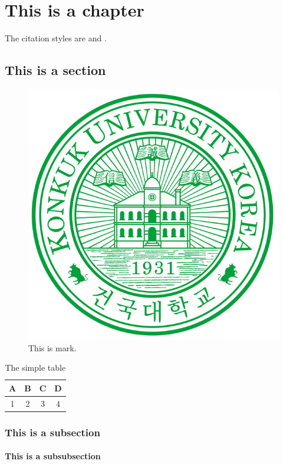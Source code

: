 \documentclass[11pt]{report}
\begin{document}
\begin{KUabstract}
\lipsum[1]
\end{KUabstract}



% 
%
\chapter{This is a chapter}
The citation styles are \cite{Weinberg:1967tq} and \cite{Glashow:1961tr,Salam:1964ry,Glashow:1970gm}.

\section{This is a section}

\begin{figure}[h] \centering
\begin{center}
\includegraphics[width=.1\textwidth]{UI_Mark.jpg}
\caption{This is mark.}
\end{center}
\end{figure}


\lipsum[1]

\begin{table}[h]
\begin{center}
\begin{tabular}{|c|c|c|c|}
  \hline
  A & B & C & D\\
  \hline
  1 & 2 & 3 & 4\\
  \hline
\end{tabular}
\end{center}
\caption{The simple table}
\end{table}

\subsection{This is a subsection}
\lipsum[1]
\subsubsection{This is a subsubsection}
\lipsum[1]


% 
%
\printbibliography[title={\normalfont\fontsize{16}{16}\bfseries References}]
\end{document}
